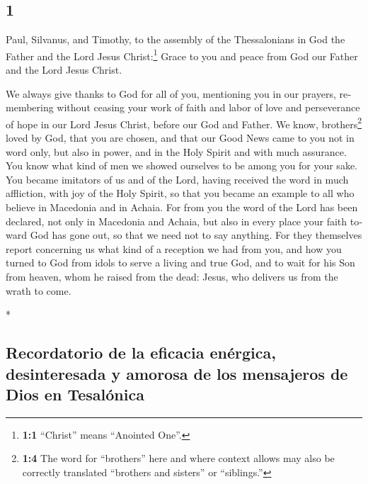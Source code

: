 \begin{paracol}{2}
\switchcolumn
\begin{otherlanguage}{english}

\hypertarget{section-1}{%
\section{1}\label{section-1}}

 Paul, Silvanus, and Timothy, to the assembly of the
Thessalonians in God the Father and the Lord Jesus Christ:\footnote{\textbf{1:1}
  ``Christ'' means ``Anointed One''.} Grace to you and peace from God
our Father and the Lord Jesus Christ.

 We always give thanks to God for all of you, mentioning
you in our prayers,  remembering without ceasing your work
of faith and labor of love and perseverance of hope in our Lord Jesus
Christ, before our God and Father.  We know,
brothers\footnote{\textbf{1:4} The word for ``brothers'' here and where
  context allows may also be correctly translated ``brothers and
  sisters'' or ``siblings.''} loved by God, that you are chosen,
 and that our Good News came to you not in word only, but
also in power, and in the Holy Spirit and with much assurance. You know
what kind of men we showed ourselves to be among you for your sake.
 You became imitators of us and of the Lord, having
received the word in much affliction, with joy of the Holy Spirit,
 so that you became an example to all who believe in
Macedonia and in Achaia.  For from you the word of the
Lord has been declared, not only in Macedonia and Achaia, but also in
every place your faith toward God has gone out, so that we need not to
say anything.  For they themselves report concerning us
what kind of a reception we had from you, and how you turned to God from
idols to serve a living and true God,  and to wait for
his Son from heaven, whom he raised from the dead: Jesus, who delivers
us from the wrath to come.

\end{otherlanguage}

\switchcolumn[0]*

\hypertarget{recordatorio-de-la-eficacia-enuxe9rgica-desinteresada-y-amorosa-de-los-mensajeros-de-dios-en-tesaluxf3nica}{%
\subsection{Recordatorio de la eficacia enérgica, desinteresada y
amorosa de los mensajeros de Dios en
Tesalónica}\label{recordatorio-de-la-eficacia-enuxe9rgica-desinteresada-y-amorosa-de-los-mensajeros-de-dios-en-tesaluxf3nica}}


\end{paracol}
